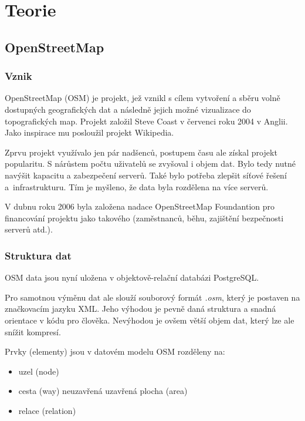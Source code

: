 \chapter{Teorie}
\label{2-Teorie}

\section{OpenStreetMap}
\label{OpenStreetMap}

\subsection{Vznik}
\label{vznik}
OpenStreetMap (OSM) je projekt, jež vznikl s cílem vytvoření a sběru 
volně dostupných geografických dat a následně jejich možné vizualizace
do topografických map. Projekt založil Steve Coast v červenci roku 
2004 v Anglii. Jako inspirace mu posloužil projekt Wikipedia.

Zprvu projekt využívalo jen pár nadšenců, postupem času ale získal
projekt popularitu. S nárůstem počtu uživatelů se zvyšoval i objem dat.
Bylo tedy nutné navýšit kapacitu a zabezpečení serverů.
Také bylo potřeba zlepšit síťové řešení a~infrastrukturu.
Tím je myšleno, že data byla rozdělena na více serverů.

V dubnu roku 2006 byla založena nadace OpenStreetMap Foundantion pro financování 
projektu jako takového (zaměstnanců, běhu, zajištění bezpečnosti serverů atd.). \cite{wikiOSM}

\subsection{Struktura dat}
\label{struktura dat}
OSM data jsou nyní uložena v objektově-relační databázi PostgreSQL. \cite{OSMserver}

Pro samotnou výměnu dat ale slouží souborový formát \textit{.osm}, který je postaven na značkovacím jazyku XML. 
Jeho výhodou je pevně daná struktura a snadná orientace v kódu pro člověka. 
Nevýhodou je ovšem větší objem dat, který lze ale snížit kompresí. 

Prvky (elementy) jsou v datovém modelu OSM rozděleny na:
\begin{itemize}
    \item uzel (node) 
    \item cesta (way)
        \subitem neuzavřená
        \subitem uzavřená
        \subitem plocha (area)
    \item relace (relation) 
\end{itemize}

